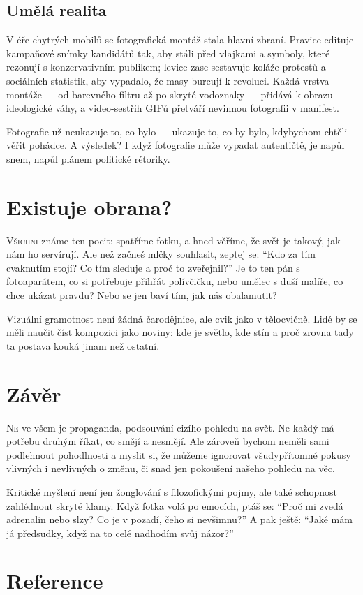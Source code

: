 \documentclass[12pt]{article} %
\begin{document}
\subsection{Umělá realita}
V éře chytrých mobilů se fotografická montáž stala hlavní zbraní. Pravice edituje kampaňové snímky kandidátů tak, 
aby stáli před vlajkami a symboly, které rezonují s konzervativním publikem; levice zase sestavuje koláže protestů 
a sociálních statistik, aby vypadalo, že masy burcují k revoluci. Každá vrstva montáže — od barevného filtru až po 
skryté vodoznaky — přidává k obrazu ideologické váhy, a video-sestřih GIFů přetváří nevinnou fotografii v manifest.

Fotografie už neukazuje to, co bylo — ukazuje to, co by bylo, kdybychom chtěli věřit pohádce.
A výsledek? I když fotografie může vypadat autentičtě, je napůl snem, napůl plánem politické rétoriky.

\section{Existuje obrana?}
\lettrine[lines=3, findent=5pt, nindent=0pt]{V}{šichni} známe ten pocit: spatříme fotku, a hned věříme, že svět je takový, jak nám ho servírují. Ale než začneš mlčky 
souhlasit, zeptej se: \enquote{Kdo za tím cvaknutím stojí? Co tím sleduje a proč to zveřejnil?} Je to ten pán s 
fotoaparátem, co si potřebuje přihřát polívčičku, nebo umělec s duší malíře, co chce ukázat pravdu? Nebo se jen baví 
tím, jak nás obalamutit?

Vizuální gramotnost není žádná čarodějnice, ale cvik jako v tělocvičně. Lidé by se měli naučit číst kompozici jako 
noviny: kde je světlo, kde stín a proč zrovna tady ta postava kouká jinam než ostatní.

\section{Závěr}
\lettrine[lines=3, findent=5pt, nindent=0pt]{N}{e} ve všem je propaganda, podsouvání cizího pohledu na svět. Ne každý má potřebu druhým říkat, co smějí a nesmějí. Ale
zároveň bychom neměli sami podlehnout pohodlnosti a myslit si, že můžeme ignorovat všudypřítomné pokusy vlivných i 
nevlivných o změnu, či snad jen pokoušení našeho pohledu na věc.

Kritické myšlení není jen žonglování s filozofickými pojmy, ale také schopnost zahlédnout skryté klamy. Když fotka volá 
po emocích, ptáš se: \enquote{Proč mi zvedá adrenalin nebo slzy? Co je v pozadí, čeho si nevšimnu?} A pak ještě: 
\enquote{Jaké mám já předsudky, když na to celé nadhodím svůj názor?}

\newpage
\section{Reference}
\nocite{*}
\printbibliography[heading=none,title={}]
\end{document}
